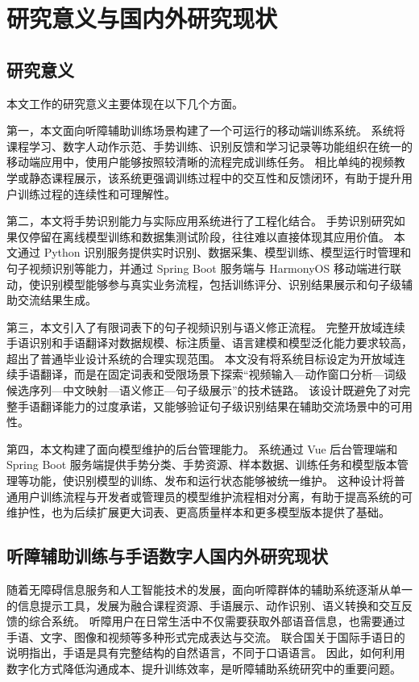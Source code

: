 
\section{研究意义与国内外研究现状}

\subsection{研究意义}

本文工作的研究意义主要体现在以下几个方面。

第一，本文面向听障辅助训练场景构建了一个可运行的移动端训练系统。
系统将课程学习、数字人动作示范、手势训练、识别反馈和学习记录等功能组织在统一的移动端应用中，使用户能够按照较清晰的流程完成训练任务。
相比单纯的视频教学或静态课程展示，该系统更强调训练过程中的交互性和反馈闭环，有助于提升用户训练过程的连续性和可理解性。

第二，本文将手势识别能力与实际应用系统进行了工程化结合。
手势识别研究如果仅停留在离线模型训练和数据集测试阶段，往往难以直接体现其应用价值。
本文通过 Python 识别服务提供实时识别、数据采集、模型训练、模型运行时管理和句子视频识别等能力，并通过 Spring Boot 服务端与 HarmonyOS 移动端进行联动，使识别模型能够参与真实业务流程，包括训练评分、识别结果展示和句子级辅助交流结果生成。

第三，本文引入了有限词表下的句子视频识别与语义修正流程。
完整开放域连续手语识别和手语翻译对数据规模、标注质量、语言建模和模型泛化能力要求较高，超出了普通毕业设计系统的合理实现范围。
本文没有将系统目标设定为开放域连续手语翻译，而是在固定词表和受限场景下探索“视频输入—动作窗口分析—词级候选序列—中文映射—语义修正—句子级展示”的技术链路。
该设计既避免了对完整手语翻译能力的过度承诺，又能够验证句子级识别结果在辅助交流场景中的可用性。

第四，本文构建了面向模型维护的后台管理能力。
系统通过 Vue 后台管理端和 Spring Boot 服务端提供手势分类、手势资源、样本数据、训练任务和模型版本管理等功能，使识别模型的训练、发布和运行状态能够被统一维护。
这种设计将普通用户训练流程与开发者或管理员的模型维护流程相对分离，有助于提高系统的可维护性，也为后续扩展更大词表、更高质量样本和更多模型版本提供了基础。

\subsection{听障辅助训练与手语数字人国内外研究现状}

随着无障碍信息服务和人工智能技术的发展，面向听障群体的辅助系统逐渐从单一的信息提示工具，发展为融合课程资源、手语展示、动作识别、语义转换和交互反馈的综合系统。
听障用户在日常生活中不仅需要获取外部语音信息，也需要通过手语、文字、图像和视频等多种形式完成表达与交流。
联合国关于国际手语日的说明指出，手语是具有完整结构的自然语言，不同于口语语言\cite{un-sign-languages-day}。
因此，如何利用数字化方式降低沟通成本、提升训练效率，是听障辅助系统研究中的重要问题。

